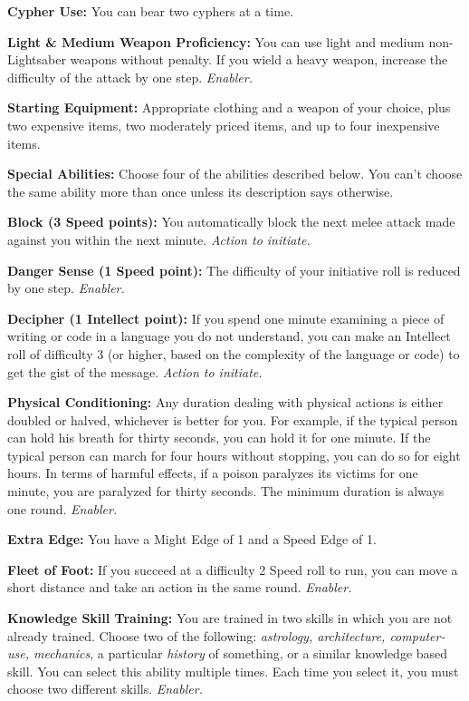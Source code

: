 \documentclass[a4paper,10pt,final,twocolumn,oneside]{book}
\newcommand{\itemLine}[2]{\textbf{#1:}{ #2}\par}
\newcommand{\itemAbility}[2]{\textcolor{25gray}{\textbullet\textbf{ #1:}}{ #2}\par}
\newcommand{\enabler}{\textit{ Enabler.}}
\newcommand{\actionInit}{\textit{ Action to initiate.}}
\begin{document}
\itemLine{Cypher Use}{You can bear two cyphers at a time.}

\itemLine{Light \& Medium Weapon Proficiency}{You can use light and medium non-Lightsaber weapons without penalty. If you wield a heavy weapon, increase the difficulty of the attack by one step.\enabler}

\itemLine{Starting Equipment}{Appropriate clothing and a weapon of your choice, plus two expensive items, two moderately priced items, and up to four inexpensive items.}

\itemLine{Special Abilities}{Choose four of the abilities described below. You can’t choose the same ability more than once unless its description says otherwise.}

\itemAbility{Block (3 Speed points)}{You automatically block the next melee attack made against you within the next minute.\actionInit}

\itemAbility{Danger Sense (1 Speed point)}{The difficulty of your initiative roll is reduced by one step.\enabler}

\itemAbility{Decipher (1 Intellect point)}{If you spend one minute examining a piece of writing or code in a language you do not understand, you can make an Intellect roll of difficulty 3 (or higher, based on the complexity of the language or code) to get the gist of the message.\actionInit}

\itemAbility{Physical Conditioning}{Any duration dealing with physical actions is either doubled or halved, whichever is better for you. For example, if the typical person can hold his breath for thirty seconds, you can hold it for one minute. If the typical person can march for four hours without stopping, you can do so for eight hours. In terms of harmful effects, if a poison paralyzes its victims for one minute, you are paralyzed for thirty seconds. The minimum duration is always one round.\enabler} \itemAbility{Extra Edge}{You have a Might Edge of 1 and a Speed Edge of 1.}

\itemAbility{Fleet of Foot}{If you succeed at a difficulty 2 Speed roll to run, you can move a short distance and take an action in the same round.\enabler}

\itemAbility{Knowledge Skill Training}{You are trained in two skills in which you are not already trained. Choose two of the following: \textit{astrology, architecture, computer-use, mechanics}, a particular \textit{history} of something, or a similar knowledge based skill. You can select this ability multiple times. Each time you select it, you must choose two different skills.\enabler}
\end{document}
